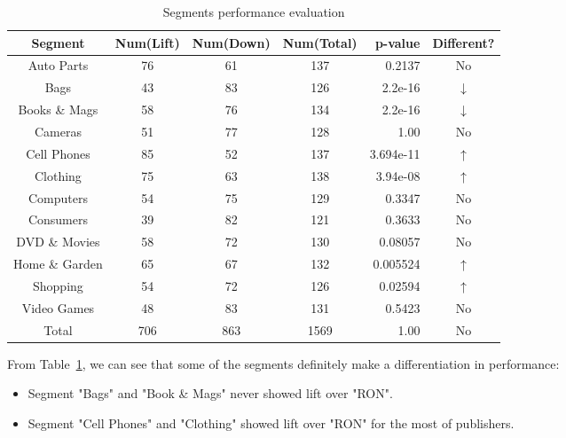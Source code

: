 \documentclass[12pt]{article}
\begin{document}
\begin{table}[ht!]
  \begin{center}
    \begin{tabular}{|c|c|c|c|r|c|}
      \hline
      Segment        & Num(Lift) & Num(Down) & Num(Total) & p-value   & Different?    \\ \hline
      Auto Parts     &   76      &   61      &   137      & 0.2137    &  No           \\ \hline
      Bags           &   43      &   83      &   126      & 2.2e-16   &  $\downarrow$ \\ \hline
      Books \& Mags  &   58      &   76      &   134      & 2.2e-16   &  $\downarrow$ \\ \hline
      Cameras        &   51      &   77      &   128      & 1.00      &  No           \\ \hline
      Cell Phones    &   85      &   52      &   137      & 3.694e-11 &  $\uparrow$   \\ \hline
      Clothing       &   75      &   63      &   138      & 3.94e-08  &  $\uparrow$   \\ \hline
      Computers      &   54      &   75      &   129      & 0.3347    &  No           \\ \hline
      Consumers      &   39      &   82      &   121      & 0.3633    &  No           \\ \hline
      DVD \& Movies  &   58      &   72      &   130      & 0.08057   &  No           \\ \hline
      Home \& Garden &   65      &   67      &   132      & 0.005524  &  $\uparrow$   \\ \hline
      Shopping       &   54      &   72      &   126      & 0.02594   &  $\uparrow$   \\ \hline
      Video Games    &   48      &   83      &   131      & 0.5423    &  No           \\ \hline
      Total          &   706     &   863     &   1569     & 1.00      &  No           \\ \hline
    \end{tabular}
  \end{center}
  \caption{Segments performance evaluation \label{tab:p4}}
\end{table}

From Table~\ref{tab:p4}, we can see that some of the segments definitely make a differentiation in performance:

\begin{itemize}
  \item Segment "Bags" and "Book \& Mags" never showed lift over "RON".
  \item Segment "Cell Phones" and "Clothing" showed lift over "RON" for the most of publishers.
\end{itemize}
\end{document}
